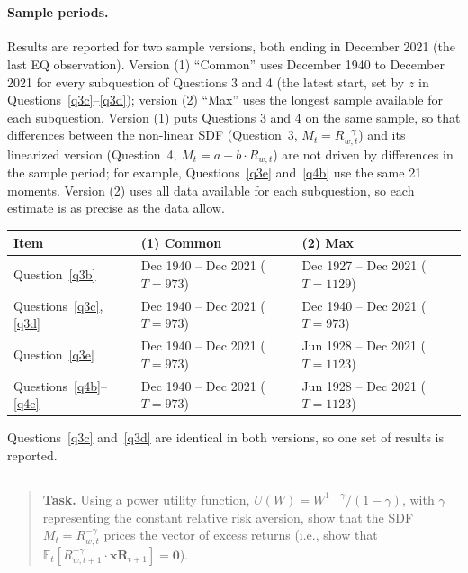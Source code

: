 \documentclass[11pt]{article}
\newcommand{\task}[1]{\begin{quote}\small\textbf{Task.} #1\end{quote}}
\begin{document}
\clearpage
\section{}\label{q3}
\paragraph{Sample periods.}
Results are reported for two sample versions, both ending in December 2021 (the last EQ observation).
Version (1) ``Common'' uses December 1940 to December 2021 for every subquestion of Questions 3 and 4 (the
latest start, set by $z$ in Questions~\ref{q3c}--\ref{q3d}); version (2) ``Max'' uses the longest sample
available for each subquestion. Version (1) puts Questions 3 and 4 on the same sample, so that differences
between the non-linear SDF (Question~3, $M_t = R_{w,t}^{-\gamma}$) and its linearized version (Question~4,
$M_t = a - b \cdot R_{w,t}$) are not driven by differences in the sample period; for example,
Questions~\ref{q3e} and~\ref{q4b} use the same 21 moments. Version (2) uses all data available for each
subquestion, so each estimate is as precise as the data allow.

\begin{center}
\small
\begin{tabular}{lll}
  \toprule
  Item & (1) Common & (2) Max \\
  \midrule
  Question~\ref{q3b}                    & Dec 1940 -- Dec 2021 ($T = 973$) & Dec 1927 -- Dec 2021 ($T = 1129$) \\
  Questions~\ref{q3c}, \ref{q3d}        & Dec 1940 -- Dec 2021 ($T = 973$) & Dec 1940 -- Dec 2021 ($T = 973$) \\
  Question~\ref{q3e}                    & Dec 1940 -- Dec 2021 ($T = 973$) & Jun 1928 -- Dec 2021 ($T = 1123$) \\
  Questions~\ref{q4b}--\ref{q4e}        & Dec 1940 -- Dec 2021 ($T = 973$) & Jun 1928 -- Dec 2021 ($T = 1123$) \\
  \bottomrule
\end{tabular}
\end{center}
Questions~\ref{q3c} and~\ref{q3d} are identical in both versions, so one set of results is reported.

\subsection{}\label{q3a}
\task{Using a power utility function, $U(W) = W^{1-\gamma}/(1-\gamma)$, with $\gamma$ representing the constant relative risk aversion, show that the SDF $M_t = R_{w,t}^{-\gamma}$ prices the vector of excess returns (i.e., show that $\mathbb{E}_t[R_{w,t+1}^{-\gamma} \cdot \mathbf{xR}_{t+1}] = \mathbf{0}$).}
\end{document}

